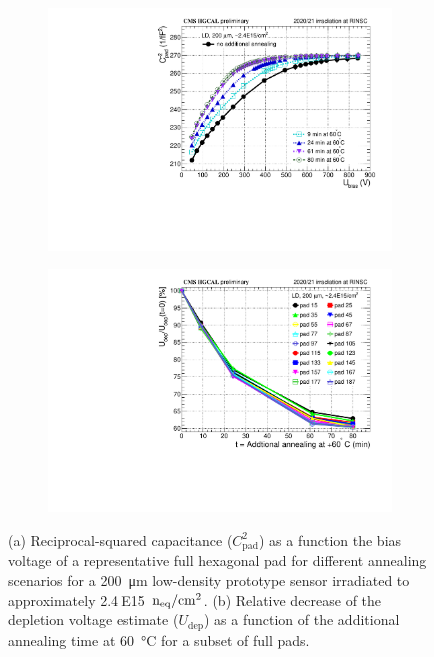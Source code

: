 \begin{figure}
	\captionsetup[subfigure]{aboveskip=-1pt,belowskip=-1pt}
	\centering

	\begin{subfigure}[b]{0.49\textwidth}
		\includegraphics[width=0.999\textwidth]{plots/annealing_Vdep/annealing_CV_ch24.pdf}
		\subcaption{
		}
        \label{plot:annealing_CV}
	\end{subfigure}
    \hfill
    \begin{subfigure}[b]{0.49\textwidth}
		\includegraphics[width=0.999\textwidth]{plots/annealing_Vdep/annealing_Vdep.pdf}
		\subcaption{
		}		
        \label{plot:annealing_Vdep}
	\end{subfigure}
	\caption{
        (a) Reciprocal-squared capacitance ($C^2_\text{pad}$) as a function the bias voltage of a representative full hexagonal pad for different annealing scenarios for a \SI{200}{\micro\metre} low-density prototype sensor irradiated to approximately 2.4$~$E15~$\mathrm{n_{eq}}/\mathrm{cm}^{2}$.   
		(b) Relative decrease of the depletion voltage estimate ($U_\text{dep}$) as a function of the additional annealing time at \SI{60}{\celsius} for a subset of full pads.
	}
\end{figure}
